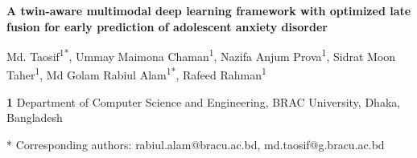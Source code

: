 \documentclass[10pt,letterpaper]{article}
\begin{document}
\vspace*{0.2in}

\begin{flushleft}
{\Large
\textbf{A twin-aware multimodal deep learning framework with optimized late fusion for early prediction of adolescent anxiety disorder}
}
\newline

Md. Taosif\textsuperscript{1*},
Ummay Maimona Chaman\textsuperscript{1},
Nazifa Anjum Prova\textsuperscript{1},
Sidrat Moon Taher\textsuperscript{1},
Md Golam Rabiul Alam\textsuperscript{1*},
Rafeed Rahman\textsuperscript{1}
\\
\bigskip

\textbf{1} Department of Computer Science and Engineering, BRAC University, Dhaka, Bangladesh
\\
\bigskip

* Corresponding authors: rabiul.alam@bracu.ac.bd, md.taosif@g.bracu.ac.bd

\end{flushleft}


%
\end{document}
